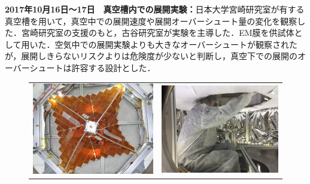 \noindent \textbf{2017年10月16日～17日　真空槽内での展開実験：}日本大学宮崎研究室が有する真空槽を用いて，真空中での展開速度や展開オーバーシュート量の変化を観察した．宮崎研究室の支援のもと，古谷研究室が実験を主導した．EM膜を供試体として用いた．空気中での展開実験よりも大きなオーバーシュートが観察されたが，展開しきらないリスクよりは危険度が少ないと判断し，真空下での展開のオーバーシュートは許容する設計とした．
\begin{figure}[H]
	\centering
	\begin{tabular}{cc}
		\begin{minipage}{0.5\hsize}
			\begin{center}
				\includegraphics[width=1\textwidth]{03/fig/3-9-3-1-6.jpg}
			\end{center}
		\end{minipage}&
		\begin{minipage}{0.5\hsize}
			\begin{center}
				\includegraphics[width=1\textwidth]{03/fig/3-9-3-1-7.jpg}

\end{center}
\end{minipage}
\end{tabular}
\end{figure}
